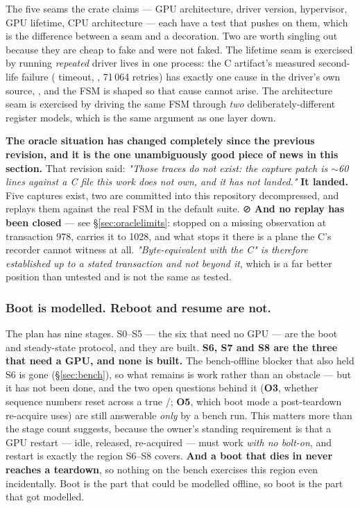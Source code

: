 \documentclass[10.5pt]{article}
\begin{document}
The five seams the crate claims — GPU architecture, driver version, hypervisor, GPU lifetime, CPU
architecture — each have a test that pushes on them, which is the difference between a seam and a
decoration. Two are worth singling out because they are cheap to fake and were not faked. The
lifetime seam is exercised by running \emph{repeated} driver lives in one process: the C
artifact's measured second-life failure ( timeout, , 71\,064 retries)
has exactly one cause in the driver's own source, , and the FSM is shaped so
that cause cannot arise. The architecture seam is exercised by driving the same FSM through
\emph{two} deliberately-different register models, which is the same argument as 
one layer down.

\textbf{The oracle situation has changed completely since the previous revision, and it is the
one unambiguously good piece of news in this section.} That revision said: \emph{"Those traces do
not exist: the capture patch is $\sim$60 lines against a C file this work does not own, and it has
not landed."} \textbf{It landed.} Five captures exist, two are committed into this repository
decompressed, and  replays them against the real FSM in the default suite. ⊘
\textbf{And no replay has been closed} — see \S\ref{sec:oraclelimits}:  stopped on a
missing observation at transaction 978,  carries it to 1028, and what stops it there
is a plane the C's recorder cannot witness at all. \emph{"Byte-equivalent with the C" is
therefore established up to a stated transaction and not beyond it}, which is a far better
position than untested and is not the same as tested.

\subsubsection*{Boot is modelled. Reboot and resume are not.}

The plan has nine stages. S0--S5 — the six that need no GPU — are the boot and steady-state
protocol, and they are built. \textbf{S6, S7 and S8 are the three that need a GPU, and none is
built.} The bench-offline blocker that also held S6 is gone (\S\ref{sec:bench}), so what remains
is work rather than an obstacle — but it has not been done, and the two open questions behind it
(\textbf{O3}, whether sequence numbers reset across a true /;
\textbf{O5}, which boot mode a post-teardown re-acquire uses) are still answerable \emph{only} by
a bench run. This matters more than the stage count suggests, because the owner's standing
requirement is that a GPU restart — idle, released, re-acquired — must work \emph{with no
bolt-on}, and restart is exactly the region S6--S8 covers. \textbf{And a boot that dies in
 never reaches a teardown}, so nothing on the bench exercises this region
even incidentally. Boot is the part that could be modelled offline, so boot is the part that got
modelled.
\end{document}

